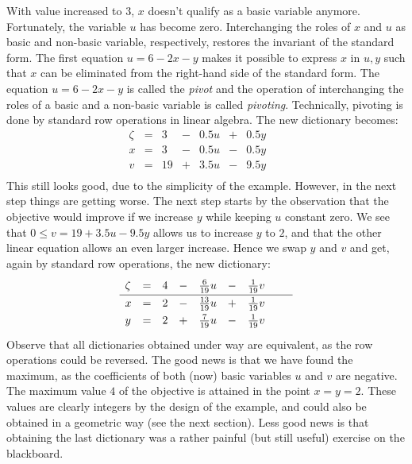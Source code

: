 \documentclass[ukenglish]{nik}
\begin{document}
With value increased to $3$, $x$ doesn't qualify as a basic variable anymore.
Fortunately, the variable $u$ has become zero. Interchanging the roles of
$x$ and $u$ as basic and non-basic variable, respectively, restores 
the invariant of the standard form. The first equation $u = 6 -2x-y$ makes it
possible to express $x$ in $u,y$ such that $x$ can be eliminated from the
right-hand side of the standard form. The equation $u = 6 -2x-y$ is
called the \emph{pivot} and the operation of interchanging the roles of
a basic and a non-basic variable is called \emph{pivoting}.
Technically, pivoting is done by standard row operations in linear algebra. 
The new dictionary becomes:
\[    
    \begin{array}{lcrcrcrcr}
      \zeta&=& 3 &-& 0.5 u &+& 0.5 y & &  \\\hline
      x    &=& 3 &-& 0.5 u &-& 0.5 y & &  \\
      v    &=& 19&+& 3.5 u &-& 9.5 y & &  \\

    \end{array}
\]
This still looks good, due to the simplicity of the example.
However, in the next step things are getting worse. The next step
starts by the observation that the objective would improve if we 
increase $y$ while keeping $u$ constant zero. We see that
$0\leq v = 19 + 3.5u - 9.5y$ allows us to increase $y$ to $2$,
and that the other linear equation allows an even larger increase.
Hence we swap $y$ and $v$ and get,
again by standard row operations, the new dictionary:
\[    
    \begin{array}{lcrcrcrcr}
      \zeta&=& 4 &-& \frac{6}{19} u &-& \frac{1}{19} v &\vphantom{\frac{|}{|}} &  \\\hline
      x    &=& 2 &-&\frac{13}{19} u &+& \frac{1}{19} v &\vphantom{\frac{|}{|}} &  \\
      y    &=& 2 &+& \frac{7}{19} u &-& \frac{1}{19} v &\vphantom{\frac{|}{|}} &  \\
    \end{array}
\]
Observe that all dictionaries obtained under way are equivalent,
as the row operations could be reversed. 
The good news is that we have found the maximum, as the coefficients of
both (now) basic variables $u$ and $v$ are negative. The maximum value $4$
of the objective is attained in the point $x=y=2$. These values are clearly
integers by the design of the example, and could also be obtained in a geometric
way (see the next section). Less good news is that obtaining the last dictionary
was a rather painful (but still useful) exercise on the blackboard.
\end{document}
